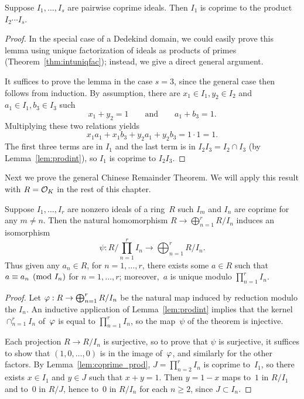 \begin{lemma}\label{lem:coprime_prod}
Suppose $I_1,\ldots, I_s$ are pairwise coprime ideals.
Then $I_1$ is coprime to the product $I_2\cdots I_s$.
\end{lemma}
\begin{proof}
In the special case of a Dedekind domain, we could easily
prove this lemma using unique factorization of ideals as
products of primes (Theorem~\ref{thm:intuniqfac}); instead,
we give a direct general argument.

It suffices to prove the lemma in the case $s=3$, since the
general case then follows from induction.
By assumption, there
are $x_1 \in I_1, y_2 \in I_2$ and $a_1 \in I_1, b_3 \in I_3$
such
$$ 
x_1 + y_2 = 1 \qquad\text{and}\qquad a_1 + b_3 = 1.
$$
Multiplying these two relations yields
$$
x_1 a_1 + x_1 b_3 + y_2 a_1 + y_2 b_3 = 1 \cdot 1 = 1.
$$
The first three terms are in $I_1$ and the last term is in 
$I_2 I_3 = I_2 \cap I_3$ (by Lemma~\ref{lem:prodint}), 
so $I_1$ is coprime to $I_2 I_3$.
\end{proof}

Next we prove the general Chinese Remainder Theorem.
We will apply this result with $R=\mathcal{O}_K$ in the rest of this chapter.
\begin{theorem}\label{thm:crt}
Suppose $I_1,\ldots, I_r$ are nonzero ideals of a ring~$R$ such 
$I_m$ and $I_n$ are coprime for any $m\neq n$.  Then the natural
homomorphism $R \to \bigoplus_{n=1}^r R/I_n$ induces an isomorphism
$$
\psi: R/\prod_{n=1}^r I_n \to \bigoplus_{n=1}^r R/I_n.
$$
Thus given any $a_n \in R$, for $n=1,\ldots,r$, there exists some $a\in R$
such that $a\equiv a_n\pmod{I_n}$ for $n=1,\ldots, r$; moreover,~$a$ 
is unique modulo $\prod_{n=1}^r I_n$.
\end{theorem}

\begin{proof}
Let 
$
  \varphi:R \to \bigoplus_{n=1}^r R/I_n
$
be the natural map induced by reduction modulo
the $I_n$.  
An inductive application of Lemma~\ref{lem:prodint} 
implies that
the kernel $\cap_{n=1}^r I_n$ of~$\varphi$ 
is equal to 
$\prod_{n=1}^r I_n$, so the map~$\psi$ of the theorem is injective.  

Each projection $R\to R/I_n$ is  surjective, so to prove
that $\psi$ is surjective, it suffices 
to show that $(1,0,\ldots,0)$
is in the image of~$\varphi$, and similarly for the other
factors.  By Lemma~\ref{lem:coprime_prod}, 
$J=\prod_{n=2}^rI_n$ is coprime to~$I_1$, so
there exists $x\in I_1$ and $y \in J$ such that
$x+y=1$.  Then $y = 1-x$ maps to~$1$ in 
$R/I_1$ and to~$0$ in $R/J$, hence to~$0$ in $R/I_n$
for each $n\geq 2$, since $J\subset I_n$. 
\end{proof}


